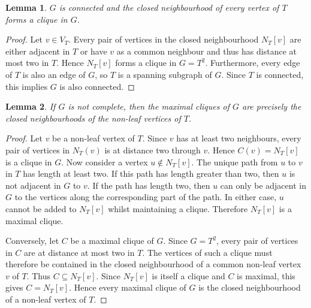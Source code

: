\documentclass[11pt]{report}
\newtheorem{lemma}{Lemma}
\begin{document}
\begin{lemma} \label{lemma::2}
  $G$ is connected and the closed neighbourhood of every vertex of $T$ forms a clique in $G$.
\end{lemma}
\begin{proof}
  Let $v \in V_T$. Every pair of vertices in the closed neighbourhood $N_T[v]$ are either adjacent in $T$ or have $v$ as a common neighbour and thus has distance at most two in $T$. Hence $N_T[v]$ forms a clique in $G = T^2$. Furthermore, every edge of $T$ is also an edge of $G$, so $T$ is a spanning subgraph of $G$. Since $T$ is connected, this implies $G$ is also connected.
\end{proof}

\begin{lemma}\label{lemma::3}
  If $G$ is not complete, then the maximal cliques of $G$ are precisely the closed neighbourhoods of the non-leaf vertices of $T$.
\end{lemma}
\begin{proof}
  Let $v$ be a non-leaf vertex of $T$. Since $v$ has at least two neighbours, every pair of vertices in $N_T(v)$ is at distance two through $v$. Hence $C(v) = N_T[v]$ is a clique in $G$. Now consider a vertex $u \notin N_T[v]$. The unique path from $u$ to $v$ in $T$ has length at least two. If this path has length greater than two, then $u$ is not adjacent in $G$ to $v$. If the path has length two, then $u$ can only be adjacent in $G$ to the vertices along the corresponding part of the path. In either case, $u$ cannot be added to $N_T[v]$ whilst maintaining a clique. Therefore $N_T[v]$ is a maximal clique.

  Conversely, let $C$ be a maximal clique of $G$. Since $G = T^2$, every pair of vertices in $C$ are at distance at most two in $T$. The vertices of such a clique must therefore be contained in the closed neighbourhood of a common non-leaf vertex $v$ of $T$. Thus $C \subseteq N_T[v]$. Since $N_T[v]$ is itself a clique and $C$ is maximal, this gives
  $C = N_T[v]$. Hence every maximal clique of $G$ is the closed neighbourhood of a non-leaf vertex of $T$.
\end{proof}
\end{document}
